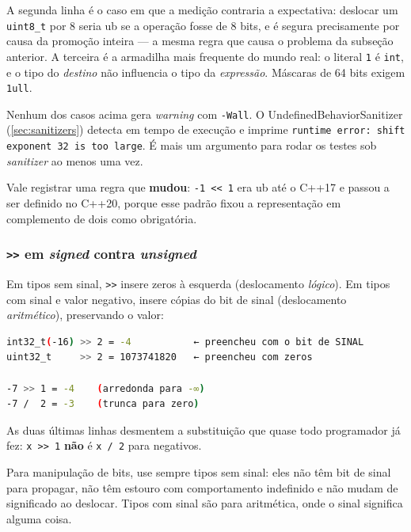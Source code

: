 A segunda linha é o caso em que a medição contraria a expectativa: deslocar um
\texttt{uint8\_t} por 8 seria \gls{ub} se a operação fosse de 8 bits, e é segura
precisamente por causa da promoção inteira --- a mesma regra que causa o
problema da subseção anterior. A terceira é a armadilha mais frequente do
mundo real: o literal \texttt{1} é \texttt{int}, e o tipo do \emph{destino} não
influencia o tipo da \emph{expressão}. Máscaras de 64 bits exigem
\texttt{1ull}.

\begin{armadilha}
Nenhum dos casos acima gera \emph{warning} com \texttt{-Wall}. O
UndefinedBehaviorSanitizer (\cref{sec:sanitizers}) detecta em tempo de execução
e imprime \texttt{runtime error: shift exponent 32 is too large}. É mais um
argumento para rodar os testes sob \emph{sanitizer} ao menos uma vez.
\end{armadilha}

Vale registrar uma regra que \textbf{mudou}: \texttt{-1 << 1} era \gls{ub} até o
C++17 e passou a ser definido no C++20, porque esse padrão fixou a representação
em complemento de dois como obrigatória.

\subsubsection{\texttt{>>} em \emph{signed} contra \emph{unsigned}}

Em tipos sem sinal, \texttt{>>} insere zeros à esquerda (deslocamento
\emph{lógico}). Em tipos com sinal e valor negativo, insere cópias do bit de
sinal (deslocamento \emph{aritmético}), preservando o valor:

\begin{lstlisting}[style=bt, language=bash,
    caption={Saída de \texttt{src/bits/}: os mesmos bits, dois resultados.}]
int32_t(-16) >> 2 = -4           ← preencheu com o bit de SINAL
uint32_t     >> 2 = 1073741820   ← preencheu com zeros

-7 >> 1 = -4    (arredonda para -∞)
-7 /  2 = -3    (trunca para zero)
\end{lstlisting}

As duas últimas linhas desmentem a substituição que quase todo programador já
fez: \texttt{x >> 1} \textbf{não} é \texttt{x / 2} para negativos.

\begin{regra}
Para manipulação de bits, use sempre tipos sem sinal: eles não têm bit de sinal
para propagar, não têm estouro com comportamento indefinido e não mudam de
significado ao deslocar. Tipos com sinal são para aritmética, onde o sinal
significa alguma coisa.
\end{regra}


